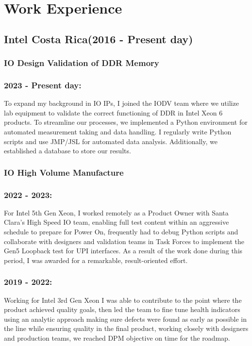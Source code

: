 \documentclass{article}
\begin{document}
\section{Work Experience}
\subsection{Intel Costa Rica(2016 - Present day)}

\subsubsection{IO Design Validation of DDR Memory}
\subsubsection{2023 - Present day:}
To expand my background in IO IPs, I joined the IODV team where we utilize lab equipment to validate the correct functioning of DDR in Intel Xeon 6 products. To streamline our processes, we implemented a Python environment for automated measurement taking and data handling. I regularly write Python scripts and use JMP/JSL for automated data analysis. Additionally, we established a database to store our results.

\subsubsection{IO High Volume Manufacture}
\subsubsection{2022 - 2023:}
For Intel 5th Gen Xeon, I worked remotely as a Product Owner with Santa Clara’s High Speed IO team, enabling full test content within an aggressive schedule to prepare for Power On, frequently had to debug Python scripts and collaborate with designers and validation teams in Task Forces to implement the Gen5 Loopback test for UPI interfaces. As a result of the work done during this period, I was awarded for a remarkable, result-oriented effort.
\subsubsection{2019 - 2022:}
Working for Intel 3rd Gen Xeon I was able to contribute to the point where the product achieved quality goals, then led the team to fine tune health indicators using an analytic approach making sure defects were found as early as possible in the line while ensuring quality in the final product, working closely with designers and production teams, we reached DPM objective on time for the roadmap.
\end{document}
